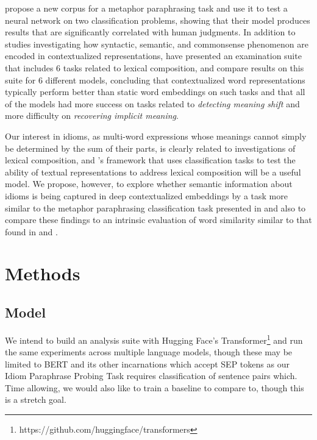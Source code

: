 \documentclass[11pt,a4paper]{article}
\begin{document}
\citet{bizzoni-lappin-2018-predicting} propose a new corpus for a metaphor paraphrasing task and use it to test a neural network on two classification problems, showing that their model produces results that are significantly correlated with human judgments. In addition to studies investigating how syntactic, semantic, and commonsense \citep{zhou2019evaluating} phenomenon are encoded in contextualized representations, \citet{shwartz2019pain} have presented an examination suite that includes 6 tasks related to lexical composition, and compare results on this suite for 6 different models, concluding that contextualized word representations typically perform better than static word embeddings on such tasks and that all of the models had more success on tasks related to \textit{detecting meaning shift} and more difficulty on \textit{recovering implicit meaning}. 

Our interest in idioms, as multi-word expressions whose meanings cannot simply be determined by the sum of their parts, is clearly related to investigations of lexical composition, and \citet{shwartz2019pain}'s framework that uses classification tasks to test the ability of textual representations to address lexical composition will be a useful model. We propose, however, to explore whether semantic information about idioms is being captured in deep contextualized embeddings by a task more similar to the metaphor paraphrasing classification task presented in \citet{bizzoni-lappin-2018-predicting} and also to compare these findings to an intrinsic evaluation of word similarity similar to that found in \citet{Wang_2019} and \citet{van_Aken_2019}.




\section{Methods}

\subsection{Model}
We intend to build an analysis suite with Hugging Face's Transformer\footnote{https://github.com/huggingface/transformers} and run the same experiments across multiple language models, though these may be limited to BERT and its other incarnations which accept SEP tokens as our Idiom Paraphrase Probing Task requires classification of sentence pairs which. Time allowing, we would also like to train a baseline to compare to, though this is a stretch goal.
\end{document}
